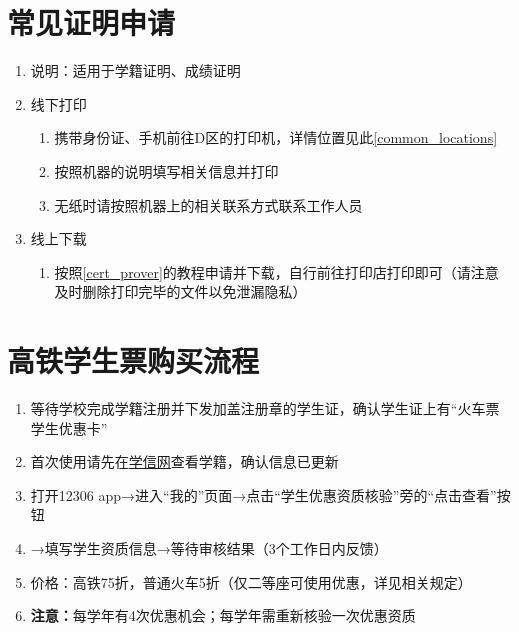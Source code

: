 \section[常见证明申请]{常见证明申请}
\begin{enumerate}
      \item 说明：适用于学籍证明、成绩证明
      \item 线下打印
            \begin{enumerate}
                  \item 携带身份证、手机前往D区的打印机，详情位置见此\uline{\ref{common_locations}}
                  \item 按照机器的说明填写相关信息并打印
                  \item 无纸时请按照机器上的相关联系方式联系工作人员
            \end{enumerate}
      \item 线上下载
            \begin{enumerate}
                  \item 按照\uline{\ref{cert_prover}}的教程申请并下载，自行前往打印店打印即可（请注意及时删除打印完毕的文件以免泄漏隐私）
            \end{enumerate}
\end{enumerate}

\section[高铁学生票购买流程]{高铁学生票\footnotemark 购买流程}
\begin{enumerate}
      \item 等待学校完成学籍注册并下发加盖注册章的学生证，确认学生证上有“火车票学生优惠卡”\footnotemark
      \item 首次使用请先在\uline{\href{https://www.chsi.com.cn/}{学信网}}查看学籍，确认信息已更新
      \item 打开12306 app→进入“我的”页面→点击“学生优惠资质核验”旁的“点击查看”按钮
      \item →填写学生资质信息→等待审核结果（3个工作日内反馈）
      \item 价格：高铁75折，普通火车5折（仅二等座可使用优惠，详见相关规定）
      \item \textbf{注意：}每学年\footnotemark 有4次优惠机会；每学年需重新核验一次优惠资质
\end{enumerate}

